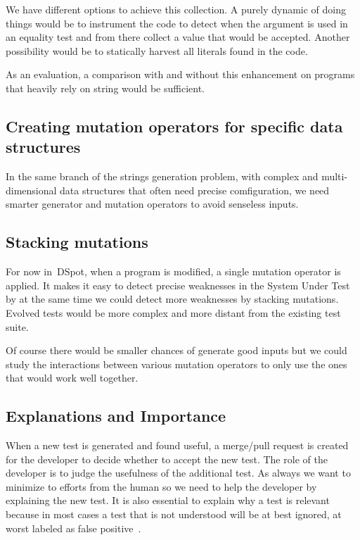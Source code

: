 \documentclass[11pt]{sdm}
\newcommand{\dspot}{DSpot\xspace}
\begin{document}
We have different options to achieve this collection.
A purely dynamic of doing things would be to instrument the code to detect when the argument is used in an equality test and from there collect a value that would be accepted.
Another possibility would be to statically harvest all literals found in the code.

As an evaluation, a comparison with and without this enhancement on programs that heavily rely on string would be sufficient.

\subsection{Creating mutation operators for specific data structures}
\label{create_operators}
In the same branch of the strings generation problem, with complex and multi-dimensional data structures that often need precise comfiguration, we need smarter generator and mutation operators to avoid senseless inputs.

\subsection{Stacking mutations}
\label{stacking}
For now in~\dspot{}, when a program is modified, a single mutation operator is applied.
It makes it easy to detect precise weaknesses in the System Under Test by at the same time we could detect more weaknesses by stacking mutations.
Evolved tests would be more complex and more distant from the existing test suite.

Of course there would be smaller chances of generate good inputs but we could study the interactions between various mutation operators to only use the ones that would work well together.

\subsection{Explanations and Importance}
\label{explanation}
When a new test is generated and found useful, a merge/pull request is created for the developer to decide whether to accept the new test.
The role of the developer is to judge the usefulness of the additional test.
As always we want to minimize to efforts from the human so we need to help the developer by explaining the new test.
It is also essential to explain why a test is relevant because in most cases a test that is not understood will be at best ignored, at worst labeled as false positive~\cite{bessey2010few}.
\end{document}
